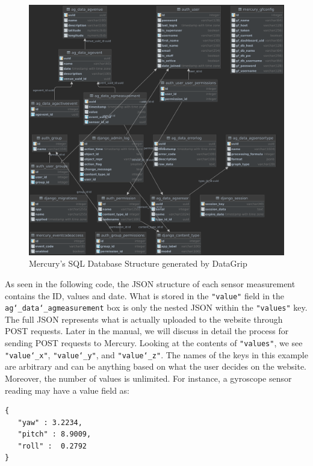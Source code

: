\documentclass[12pt, letterpaper]{article}
\begin{document}
	
\begin{figure}[t!]
\centering
\includegraphics[width=1\columnwidth]{assets/Mercury-Database.eps}
\caption{Mercury's SQL Database Structure generated by DataGrip}
\end{figure}	 

\par As seen in the following code, the JSON structure of each sensor measurement contains the ID, values and date. What is stored in the \texttt{"value"} field in the \texttt{ag\char`_data\char`_agmeasurement} box
is only the nested JSON within the \texttt{"values"} key. The full JSON represents what is actually uploaded to the website through POST requests. Later in the manual, we will discuss in detail the process for sending POST requests to Mercury. Looking at the contents of \texttt{"values"}, we see \texttt{"value\char`_x"}, \texttt{"value\char`_y"}, and \texttt{"value\char`_z"}. The names of the keys in this example are arbitrary and can be anything based on what the user decides on the website. Moreover, the number of values is unlimited. For instance, a gyroscope sensor reading may have a value field as:

\begin{verbatim}
{
   "yaw" : 3.2234,
   "pitch" : 8.9009,
   "roll" :  0.2792
}
\end{verbatim}
 
\end{document}
